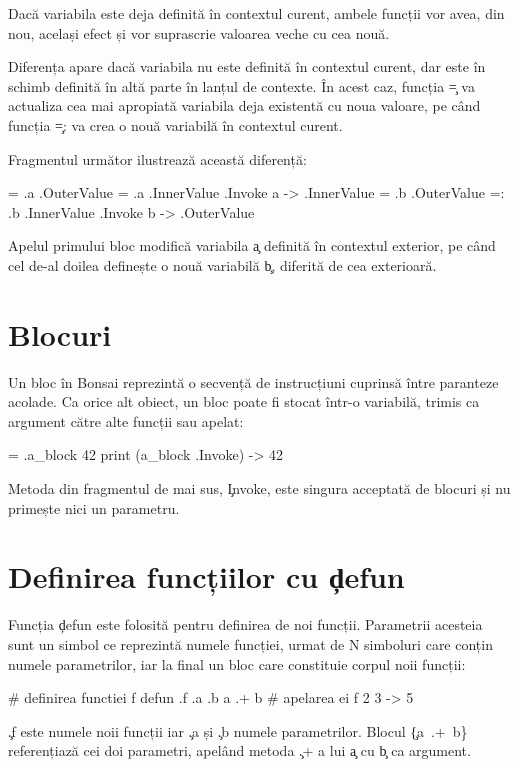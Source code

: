 \documentclass[12pt,a4paper]{memoir}
\begin{document}
Dacă variabila este deja definită în contextul curent, ambele funcții vor avea, din nou, același efect și vor suprascrie valoarea veche cu cea nouă.

Diferența apare dacă variabila nu este definită în contextul curent, dar este în schimb definită în altă parte în lanțul de contexte. În acest caz, funcția \c{=} va actualiza cea mai apropiată variabila deja existentă cu noua valoare, pe când funcția \c{=:} va crea o nouă variabilă în contextul curent. 

Fragmentul următor ilustrează această diferență:
\begin{code}
= .a .OuterValue
{ = .a .InnerValue } .Invoke
a
  -> .InnerValue
= .b .OuterValue
{ =: .b .InnerValue } .Invoke
b
  -> .OuterValue
\end{code}
Apelul primului bloc modifică variabila \c{a} definită în contextul exterior, pe când cel de-al doilea definește o nouă variabilă \c{b}, diferită de cea exterioară.

\section{Blocuri}

Un bloc în Bonsai reprezintă o secvență de instrucțiuni cuprinsă între paranteze acolade. Ca orice alt obiect, un bloc poate fi stocat într-o variabilă, trimis ca argument către alte funcții sau apelat:
\begin{code}
= .a_block { 42 }
print (a_block .Invoke)
  -> 42
\end{code}
Metoda din fragmentul de mai sus, \c{Invoke}, este singura acceptată de blocuri și nu primește nici un parametru. 

\section{Definirea funcțiilor cu \c{defun}}\label{sec:defun}

Funcția \c{defun} este folosită pentru definirea de noi funcții. Parametrii acesteia sunt un simbol ce reprezintă numele funcției, urmat de N simboluri care conțin numele parametrilor, iar la final un bloc care constituie corpul noii funcții:
\begin{code}
\# definirea functiei f
defun .f .a .b {
  a .+ b 
}
\# apelarea ei
f 2 3
  -> 5
\end{code}
\c{.f} este numele noii funcții iar \c{.a} și \c{.b} numele parametrilor. Blocul \c{\{a .+ b\}} referențiază cei doi parametri, apelând metoda \c{.+} a lui \c{a} cu \c{b} ca argument.
\end{document}
